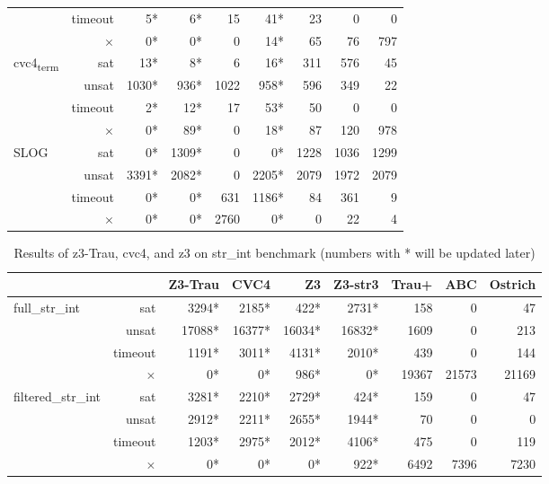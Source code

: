 {\begin{table*}[t]
\begin{tabular}{l r | r r r r r r r}
							& timeout  &     5*   &     6* &    15 &     41*  & 23 & 0 & 0 \\
							& $\times$ &     0*   &     0* &     0 &     14*  & 65 & 76 & 797 \\ \hline
\multirow{4}{*}{cvc4\textsubscript{term}} & sat & 13* & 8* &     6 &     16*  & 311 & 576 & 45 \\
							& unsat    &  1030*   &   936* &  1022 &    958*  & 596 & 349 & 22 \\
							& timeout  &     2*   &    12* &    17 &     53*  & 50 & 0 & 0 \\
							& $\times$ &     0*   &    89* &     0 &     18*  & 87 & 120 & 978 \\ \hline
\multirow{4}{*}{SLOG}  		& sat      & 0* & 1309* & 0 & 0* & 1228 & 1036 & 1299 \\
							& unsat    & 3391* & 2082* & 0 & 2205* & 2079 & 1972 & 2079 \\
							& timeout  & 0* & 0* & 631 & 1186* & 84 & 361 & 9 \\
							& $\times$ & 0* & 0* & 2760 & 0* & 0 & 22 & 4 \\ \hline
\end{tabular}
\label{table:base_benchmark}
\end{table*}

\begin{table*}[t]
\centering
\caption{Results of z3-Trau, cvc4, and z3 on str\_int benchmark (numbers with * will be updated later)}
\begin{tabular}{l r | r r r r r r r}
\hline
\multicolumn{2}{c}{}                           & Z3-Trau & CVC4   &    Z3  & Z3-str3 & Trau+ & ABC & Ostrich \\ \hline
\multirow{4}{*}{full\_str\_int}		& sat      &   3294*  &  2185* &   422* &   2731* & 158 & 0 & 47 \\ 
									& unsat    &  17088*  & 16377* & 16034* &  16832* & 1609 & 0 & 213 \\
									& timeout  &   1191*  &  3011* &  4131* &   2010* & 439 & 0 & 144 \\
									& $\times$ &      0*  &     0* &   986* &      0* & 19367 & 21573 & 21169 \\ \hline
\multirow{4}{*}{filtered\_str\_int}	& sat      &   3281*  &  2210* &  2729* &    424* & 159 & 0 & 47 \\
									& unsat    &   2912*  &  2211* &  2655* &   1944* & 70 & 0 & 0 \\
									& timeout  &   1203*  &  2975* &  2012* &   4106* & 475 & 0 & 119 \\
									& $\times$ &     0*   &     0* &     0* &    922* & 6492 & 7396 & 7230 \\ \hline
\end{tabular}
\label{table:str_int_benchmark}
\end{table*}
}





